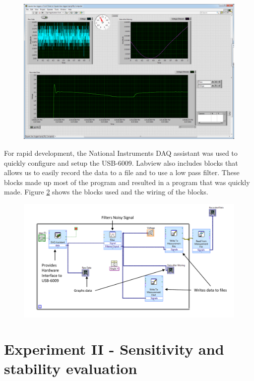 {\begin{figure}[h!tb] \centering
\includegraphics[width=\textwidth]{Images/labviewGUI.png}
\label{labviewgui}
\end{figure}
}

For rapid development, the National Instruments DAQ assistant was used to quickly configure and setup the USB-6009.  Labview also includes blocks that allows us to easily record the data to a file and to use a low pass filter.  These blocks made up most of the program and resulted in a program that was quickly made.  Figure \ref{labviewblock} shows the blocks used and the wiring of the blocks.

{\begin{figure}[h!tb] \centering
\includegraphics[width=\textwidth]{Images/labview_diagram.pdf}
\label{labviewblock}
\end{figure}
}

\section{Experiment II - Sensitivity and stability evaluation}\label{Exp2}

